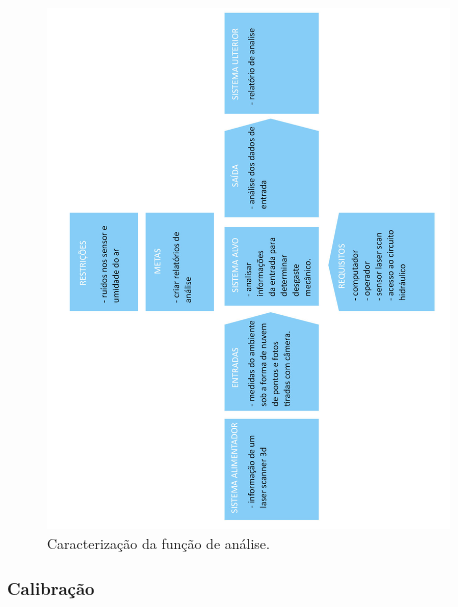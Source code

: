\documentclass[12pt,a4paper]{article}
\begin{document}
\begin{figure}[H]
\begin{center}
  \includegraphics[width=0.95\textwidth]{figs/caracterizacao_analise.jpg}
  \caption{Caracterização da função de análise.}
  \label{fig:caracterizacao_analise}
\end{center}
\end{figure} 


\subsubsection {Calibração}
\end{document}
